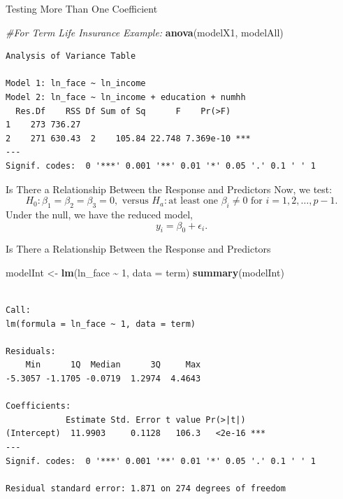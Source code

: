 \documentclass[
  ignorenonframetext,
]{beamer}
\newenvironment{Shaded}{\begin{snugshade}}{\end{snugshade}}
\newcommand{\AttributeTok}[1]{\textcolor[rgb]{0.13,0.29,0.53}{#1}}
\newcommand{\CommentTok}[1]{\textcolor[rgb]{0.56,0.35,0.01}{\textit{#1}}}
\newcommand{\DecValTok}[1]{\textcolor[rgb]{0.00,0.00,0.81}{#1}}
\newcommand{\FunctionTok}[1]{\textcolor[rgb]{0.13,0.29,0.53}{\textbf{#1}}}
\newcommand{\NormalTok}[1]{#1}
\newcommand{\OtherTok}[1]{\textcolor[rgb]{0.56,0.35,0.01}{#1}}
\newcommand{\SpecialCharTok}[1]{\textcolor[rgb]{0.81,0.36,0.00}{\textbf{#1}}}
\begin{document}
\begin{frame}[fragile]{Testing More Than One Coefficient}
\label{testing-more-than-one-coefficient-1}
\normalsize

\begin{Shaded}
\begin{Highlighting}[]
\CommentTok{\#For Term Life Insurance Example:}
\FunctionTok{anova}\NormalTok{(modelX1, modelAll)}
\end{Highlighting}
\end{Shaded}

\begin{verbatim}
Analysis of Variance Table

Model 1: ln_face ~ ln_income
Model 2: ln_face ~ ln_income + education + numhh
  Res.Df    RSS Df Sum of Sq      F    Pr(>F)    
1    273 736.27                                  
2    271 630.43  2    105.84 22.748 7.369e-10 ***
---
Signif. codes:  0 '***' 0.001 '**' 0.01 '*' 0.05 '.' 0.1 ' ' 1
\end{verbatim}

\normalsize
\end{frame}

\begin{frame}{Is There a Relationship Between the Response and
Predictors}
\label{is-there-a-relationship-between-the-response-and-predictors}
Now, we test:
\[H_0:\beta_1=\beta_2=\beta_3=0, \text{ versus } H_a: \text{at least one } \beta_i \neq 0 \text{ for } i = 1, 2, \ldots, p-1.\]
Under the null, we have the reduced model, \[y_i=\beta_0+\epsilon_i.\]
\end{frame}

\begin{frame}[fragile]{Is There a Relationship Between the Response and
Predictors}
\label{is-there-a-relationship-between-the-response-and-predictors-1}
\normalsize

\begin{Shaded}
\begin{Highlighting}[]
\NormalTok{modelInt }\OtherTok{\textless{}{-}} \FunctionTok{lm}\NormalTok{(ln\_face }\SpecialCharTok{\textasciitilde{}} \DecValTok{1}\NormalTok{, }\AttributeTok{data =}\NormalTok{ term)}
\FunctionTok{summary}\NormalTok{(modelInt)}
\end{Highlighting}
\end{Shaded}

\begin{verbatim}

Call:
lm(formula = ln_face ~ 1, data = term)

Residuals:
    Min      1Q  Median      3Q     Max 
-5.3057 -1.1705 -0.0719  1.2974  4.4643 

Coefficients:
            Estimate Std. Error t value Pr(>|t|)    
(Intercept)  11.9903     0.1128   106.3   <2e-16 ***
---
Signif. codes:  0 '***' 0.001 '**' 0.01 '*' 0.05 '.' 0.1 ' ' 1

Residual standard error: 1.871 on 274 degrees of freedom
\end{verbatim}

\normalsize
\end{frame}
\end{document}

